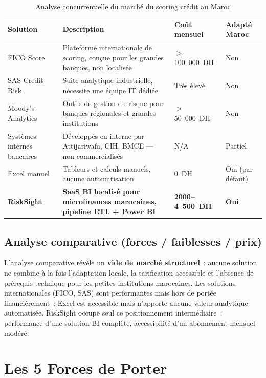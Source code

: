 \documentclass[12pt, a4paper]{report}
\begin{document}
\begin{table}[H]
\centering
\caption{Analyse concurrentielle du marché du scoring crédit au Maroc}
\label{tab:concurrents}
\renewcommand{\arraystretch}{1.5}
\begin{tabularx}{\textwidth}{p{2.5cm} X p{3cm} p{2.5cm}}
\toprule
\rowcolor{primary!12}
Solution & Description & Coût mensuel & Adapté Maroc \\
\midrule
FICO Score & Plateforme internationale de scoring, conçue pour les grandes banques, non localisée & $>$100~000~DH & \textcolor{dangercolor}{Non} \\
SAS Credit Risk & Suite analytique industrielle, nécessite une équipe IT dédiée & Très élevé & \textcolor{dangercolor}{Non} \\
Moody's Analytics & Outils de gestion du risque pour banques régionales et grandes institutions & $>$50~000~DH & \textcolor{dangercolor}{Non} \\
Systèmes internes bancaires & Développés en interne par Attijariwafa, CIH, BMCE --- non commercialisés & N/A & Partiel \\
Excel manuel & Tableurs et calculs manuels, aucune automatisation & 0~DH & Oui (par défaut) \\
\textbf{RiskSight} & \textbf{SaaS BI localisé pour microfinances marocaines, pipeline ETL + Power BI} & \textbf{2000--4~500~DH} & \textbf{\textcolor{successcolor}{Oui}} \\
\bottomrule
\end{tabularx}
\end{table}

\subsection{Analyse comparative (forces / faiblesses / prix)}

L'analyse comparative révèle un \textbf{vide de marché structurel}~: aucune solution
ne combine à la fois l'adaptation locale, la tarification accessible et l'absence
de prérequis technique pour les petites institutions marocaines. Les solutions
internationales (FICO, SAS) sont performantes mais hors de portée financièrement~;
Excel est accessible mais n'apporte aucune valeur analytique automatisée. RiskSight
occupe seul ce positionnement intermédiaire~: performance d'une solution BI complète,
accessibilité d'un abonnement mensuel modéré.

\section{Les 5 Forces de Porter}
\end{document}
